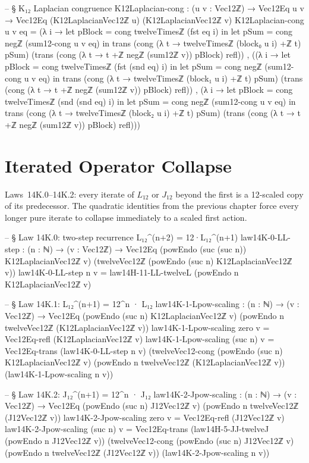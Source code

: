 \documentclass[11pt,a4paper]{book}
\begin{document}
\begin{code}
  -- § K₁₂ Laplacian congruence
  K12Laplacian-cong : (u v : Vec12ℤ) → Vec12Eq u v → Vec12Eq (K12LaplacianVec12ℤ u) (K12LaplacianVec12ℤ v)
  K12Laplacian-cong u v eq =
    (λ i →
      let pBlock = cong twelveTimesℤ (fst eq i) in
      let pSum   = cong negℤ (sum12-cong u v eq) in
      trans (cong (λ t → twelveTimesℤ (block₀ u i) +ℤ t) pSum)
            (trans (cong (λ t → t +ℤ negℤ (sum12ℤ v)) pBlock) refl)) ,
    ((λ i →
      let pBlock = cong twelveTimesℤ (fst (snd eq) i) in
      let pSum   = cong negℤ (sum12-cong u v eq) in
      trans (cong (λ t → twelveTimesℤ (block₁ u i) +ℤ t) pSum)
            (trans (cong (λ t → t +ℤ negℤ (sum12ℤ v)) pBlock) refl)) ,
     (λ i →
      let pBlock = cong twelveTimesℤ (snd (snd eq) i) in
      let pSum   = cong negℤ (sum12-cong u v eq) in
      trans (cong (λ t → twelveTimesℤ (block₂ u i) +ℤ t) pSum)
            (trans (cong (λ t → t +ℤ negℤ (sum12ℤ v)) pBlock) refl)))
\end{code}

\section{Iterated Operator Collapse}

Laws~14K.0--14K.2: every iterate of $L_{12}$ or $J_{12}$ beyond the first
is a 12-scaled copy of its predecessor.  The quadratic identities from the
previous chapter force every longer pure iterate to collapse immediately to a
scaled first action.

\begin{code}
-- § Law 14K.0: two-step recurrence L₁₂^(n+2) = 12·L₁₂^(n+1)
law14K-0-LL-step : (n : ℕ) → (v : Vec12ℤ) →
  Vec12Eq (powEndo (suc (suc n)) K12LaplacianVec12ℤ v)
         (twelveVec12ℤ (powEndo (suc n) K12LaplacianVec12ℤ v))
law14K-0-LL-step n v = law14H-11-LL-twelveL (powEndo n K12LaplacianVec12ℤ v)

-- § Law 14K.1: L₁₂^(n+1) = 12^n · L₁₂
law14K-1-Lpow-scaling : (n : ℕ) → (v : Vec12ℤ) →
  Vec12Eq (powEndo (suc n) K12LaplacianVec12ℤ v)
         (powEndo n twelveVec12ℤ (K12LaplacianVec12ℤ v))
law14K-1-Lpow-scaling zero v = Vec12Eq-refl (K12LaplacianVec12ℤ v)
law14K-1-Lpow-scaling (suc n) v =
  Vec12Eq-trans
    (law14K-0-LL-step n v)
    (twelveVec12-cong
      (powEndo (suc n) K12LaplacianVec12ℤ v)
      (powEndo n twelveVec12ℤ (K12LaplacianVec12ℤ v))
      (law14K-1-Lpow-scaling n v))

-- § Law 14K.2: J₁₂^(n+1) = 12^n · J₁₂
law14K-2-Jpow-scaling : (n : ℕ) → (v : Vec12ℤ) →
  Vec12Eq (powEndo (suc n) J12Vec12ℤ v)
         (powEndo n twelveVec12ℤ (J12Vec12ℤ v))
law14K-2-Jpow-scaling zero v = Vec12Eq-refl (J12Vec12ℤ v)
law14K-2-Jpow-scaling (suc n) v =
  Vec12Eq-trans
    (law14H-5-JJ-twelveJ (powEndo n J12Vec12ℤ v))
    (twelveVec12-cong
      (powEndo (suc n) J12Vec12ℤ v)
      (powEndo n twelveVec12ℤ (J12Vec12ℤ v))
      (law14K-2-Jpow-scaling n v))
\end{code}
\end{document}
